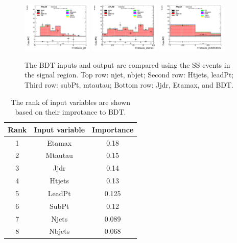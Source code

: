 \begin{figure}[htbp]
\begin{center}
  \includegraphics[width=0.3\textwidth, keepaspectratio]{fig/OneLepTwoTaus/Plots_Plots_jjdr_ssdata_signal.pdf}
  \includegraphics[width=0.3\textwidth, keepaspectratio]{fig/OneLepTwoTaus/Plots_Plots_etamax_ssdata_signal.pdf}
  \includegraphics[width=0.3\textwidth, keepaspectratio]{fig/OneLepTwoTaus/Plots_Plots_bdtT3bins_ssdata_signal.pdf}
\end{center}
\caption{The BDT inputs and output are compared using the SS events in the signal region.
Top row: njet, nbjet; Second row: Htjets, leadPt; Third row: subPt, mtautau; Bottom row: Jjdr, Etamax, and BDT.
}
\label{Fig:1l2tau.ssbdtvalidation}
\end{figure}

\begin{table}[htbp]
\begin{center}
\begin{tabular}{|c|c|c|}\hline
Rank & Input variable  & Importance \\ \hline
1 & Etamax & 0.18\\
2 & Mtautau & 0.15 \\
3 & Jjdr & 0.14 \\
4 & Htjets & 0.13 \\
5 & LeadPt & 0.125 \\
6 & SubPt & 0.12 \\
7 & Njets & 0.089 \\
8 & Nbjets & 0.068 \\ \hline
\end{tabular}
\caption{ The rank of input variables are shown based on their improtance to BDT.}
\label{Tab:1l2tau.bdtrank}
\end{center}
\end{table}

